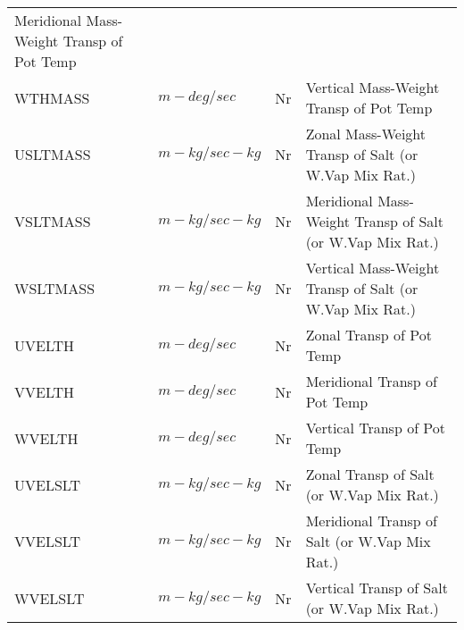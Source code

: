 \begin{tabular}{llll}
\begin{minipage}[t]{3in}
          {Meridional Mass-Weight Transp of Pot Temp} 
         \end{minipage}\\
 WTHMASS  & $m-deg/sec$ & Nr
         &\begin{minipage}[t]{3in}
          {Vertical Mass-Weight Transp of Pot Temp} 
         \end{minipage}\\
 USLTMASS & $m-kg/sec-kg$ & Nr
         &\begin{minipage}[t]{3in}
          {Zonal Mass-Weight Transp of Salt (or W.Vap Mix Rat.)} 
         \end{minipage}\\
 VSLTMASS & $m-kg/sec-kg$ & Nr
         &\begin{minipage}[t]{3in}
          {Meridional Mass-Weight Transp of Salt (or W.Vap Mix Rat.)} 
         \end{minipage}\\
 WSLTMASS & $m-kg/sec-kg$ & Nr
         &\begin{minipage}[t]{3in}
          {Vertical Mass-Weight Transp of Salt (or W.Vap Mix Rat.)} 
         \end{minipage}\\
 UVELTH   & $m-deg/sec$ & Nr
         &\begin{minipage}[t]{3in}
          {Zonal Transp of Pot Temp} 
         \end{minipage}\\
 VVELTH   & $m-deg/sec$ & Nr
         &\begin{minipage}[t]{3in}
          {Meridional Transp of Pot Temp} 
         \end{minipage}\\
 WVELTH   & $m-deg/sec$ & Nr
         &\begin{minipage}[t]{3in}
          {Vertical Transp of Pot Temp} 
         \end{minipage}\\
 UVELSLT  & $m-kg/sec-kg$ & Nr
         &\begin{minipage}[t]{3in}
          {Zonal Transp of Salt (or W.Vap Mix Rat.)} 
         \end{minipage}\\
 VVELSLT  & $m-kg/sec-kg$ & Nr
         &\begin{minipage}[t]{3in}
          {Meridional Transp of Salt (or W.Vap Mix Rat.)} 
         \end{minipage}\\
 WVELSLT  & $m-kg/sec-kg$ & Nr
         &\begin{minipage}[t]{3in}
          {Vertical Transp of Salt (or W.Vap Mix Rat.)} 
         \end{minipage}\\
\end{tabular}
\vspace{1.5in}
\vfill

